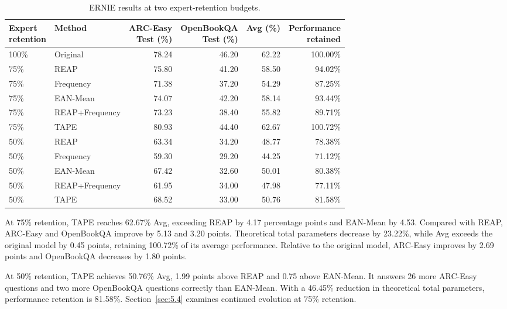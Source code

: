 \documentclass{article}
\begin{document}
\begin{table}[htbp]
\centering\small
\caption{ERNIE results at two expert-retention budgets.}
\label{tab:ernie}
\begin{tabularx}{\linewidth}{@{}lXrrrr@{}}
\toprule
\shortstack{Expert\\retention} & Method & \shortstack{ARC-Easy\\Test (\%)} & \shortstack{OpenBookQA\\Test (\%)} & Avg (\%) & \shortstack{Performance\\retained} \\
\midrule
100\% & Original & 78.24 & 46.20 & 62.22 & 100.00\% \\
\midrule
75\% & REAP & 75.80 & 41.20 & 58.50 & 94.02\% \\
75\% & Frequency & 71.38 & 37.20 & 54.29 & 87.25\% \\
75\% & EAN-Mean & 74.07 & 42.20 & 58.14 & 93.44\% \\
75\% & REAP+Frequency & 73.23 & 38.40 & 55.82 & 89.71\% \\
75\% & TAPE & 80.93 & 44.40 & 62.67 & 100.72\% \\
\midrule
50\% & REAP & 63.34 & 34.20 & 48.77 & 78.38\% \\
50\% & Frequency & 59.30 & 29.20 & 44.25 & 71.12\% \\
50\% & EAN-Mean & 67.42 & 32.60 & 50.01 & 80.38\% \\
50\% & REAP+Frequency & 61.95 & 34.00 & 47.98 & 77.11\% \\
50\% & TAPE & 68.52 & 33.00 & 50.76 & 81.58\% \\
\bottomrule
\end{tabularx}
\end{table}

At 75\% retention, TAPE reaches 62.67\% Avg, exceeding REAP by 4.17 percentage points and EAN-Mean by 4.53. Compared with REAP, ARC-Easy and OpenBookQA improve by 5.13 and 3.20 points. Theoretical total parameters decrease by 23.22\%, while Avg exceeds the original model by 0.45 points, retaining 100.72\% of its average performance. Relative to the original model, ARC-Easy improves by 2.69 points and OpenBookQA decreases by 1.80 points.

At 50\% retention, TAPE achieves 50.76\% Avg, 1.99 points above REAP and 0.75 above EAN-Mean. It answers 26 more ARC-Easy questions and two more OpenBookQA questions correctly than EAN-Mean. With a 46.45\% reduction in theoretical total parameters, performance retention is 81.58\%. Section~\ref{sec:5.4} examines continued evolution at 75\% retention.
\end{document}
